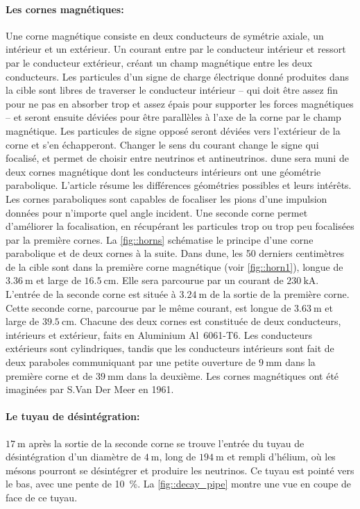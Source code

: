 	         \paragraph{Les cornes magnétiques:} Une corne magnétique consiste en deux conducteurs de symétrie axiale, un intérieur et un extérieur. Un courant entre par le conducteur intérieur et ressort par le conducteur extérieur, créant un champ magnétique entre les deux conducteurs. Les particules d'un signe de charge électrique donné produites dans la cible sont libres de traverser le conducteur intérieur -- qui doit être assez fin pour ne pas en absorber trop et assez épais pour supporter les forces magnétiques -- et seront ensuite déviées pour être parallèles à l'axe de la corne par le champ magnétique. Les particules de signe opposé seront déviées vers l'extérieur de la corne et s'en échapperont. Changer le sens du courant change le signe qui focalisé, et permet de choisir entre neutrinos et antineutrinos. \gls{dune} sera muni de deux cornes magnétique dont les conducteurs intérieurs ont une géométrie parabolique. L'article \cite{Kopp2006} résume les différences géométries possibles et leurs intérêts. Les cornes paraboliques sont capables de focaliser les pions d'une impulsion données pour n'importe quel angle incident. Une seconde corne permet d'améliorer la focalisation, en récupérant les particules trop ou trop peu focalisées par la première cornes. La \autoref{fig::horns} schématise le principe d'une corne parabolique et de deux cornes à la suite.
	         Dans \gls{dune}, les 50 derniers centimètres de la cible sont dans la première corne magnétique (voir \autoref{fig::horn1}), longue de $\SI{3.36}{\meter}$ et large de $\SI{16.5}{\centi\meter}$. Elle sera parcourue par un courant de $\SI{230}{\kilo\ampere}$. L'entrée de la seconde corne est située à $\SI{3.24}{\meter}$ de la sortie de la première corne. Cette seconde corne, parcourue par le même courant, est longue de  $\SI{3.63}{\meter}$ et large de $\SI{39.5}{\centi\meter}$. Chacune des deux cornes est constituée de deux conducteurs, intérieurs et extérieur, faits en Aluminium Al~6061-T6. Les conducteurs extérieurs sont cylindriques, tandis que les conducteurs intérieurs sont fait de deux paraboles communiquant par une petite ouverture de $\SI{9}{\milli\meter}$ dans la première corne et de $\SI{39}{\milli\meter}$ dans la deuxième. Les cornes magnétiques ont été imaginées par S.Van Der Meer en 1961\cite{VanDerMeer1961}.
	         
	         \paragraph{Le tuyau de désintégration:} $\SI{17}{\meter}$ après la sortie de la seconde corne se trouve l'entrée du tuyau de désintégration d'un diamètre de $\SI{4}{\meter}$, long de $\SI{194}{\meter}$ et rempli d'hélium, où les mésons pourront se désintégrer et produire les neutrinos. Ce tuyau est pointé vers le bas, avec une pente de 10~\%. La \autoref{fig::decay_pipe} montre une vue en coupe de face de ce tuyau. 
	         
